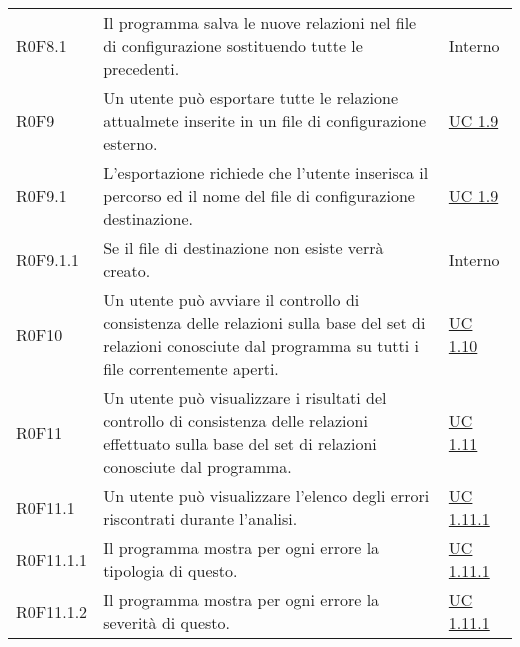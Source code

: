 \begin{center}
\begin{longtable}{p{4.2cm}!{\color{white}\vrule width 0.5mm}p{6cm}!{\color{white}\vrule width 0.5mm}p{2.5cm}!{\color{white}\vrule width 0.5mm}}
			\hspace{2mm}\hypertarget{XER0F8.1}{R0F8.1} & Il programma salva le nuove relazioni nel file di configurazione sostituendo tutte le precedenti. & Interno\\
			
		
		\hspace{0mm}\hypertarget{XER0F9}{R0F9} & Un utente può esportare tutte le relazione attualmete inserite in un file di configurazione esterno. & \hyperref[subsec:XEUC1.9]{UC 1.9}\\
			\hspace{2mm}\hypertarget{XER0F9.1}{R0F9.1} & L'esportazione richiede che l'utente inserisca il percorso ed il nome del file di configurazione destinazione. & \hyperref[subsec:XEUC1.9]{UC 1.9}\\
			
				\hspace{2mm}\hypertarget{XER0F9.1.1}{R0F9.1.1} & Se il file di destinazione non esiste verrà creato. & Interno\\
		
		
		\hspace{0mm}\hypertarget{XER0F10}{R0F10} & Un utente può avviare il controllo di consistenza delle relazioni sulla base del set di relazioni conosciute dal programma su tutti i file correntemente aperti. & \hyperref[subsec:XEUC1.10]{UC 1.10}\\
			
		\hspace{0mm}\hypertarget{XER0F11}{R0F11} & Un utente può visualizzare i risultati del controllo di consistenza delle relazioni effettuato sulla base del set di relazioni conosciute dal programma. & \hyperref[subsec:XEUC1.11]{UC 1.11}\\
			
			\hspace{2mm}\hypertarget{XER0F11.1}{R0F11.1} & Un utente può visualizzare l'elenco degli errori riscontrati durante l'analisi. & \hyperref[subsec:XEUC1.11.1]{UC 1.11.1}\\
			
				\hspace{4mm}\hypertarget{XER0F11.1.1}{R0F11.1.1} & Il programma mostra per ogni errore la tipologia di questo. & \hyperref[subsec:XEUC1.11.1]{UC 1.11.1}\\
				
				\hspace{4mm}\hypertarget{XER0F11.1.2}{R0F11.1.2} & Il programma mostra per ogni errore la severità di questo. & \hyperref[subsec:XEUC1.11.1]{UC 1.11.1}\\
				

\end{longtable}
\end{center}
